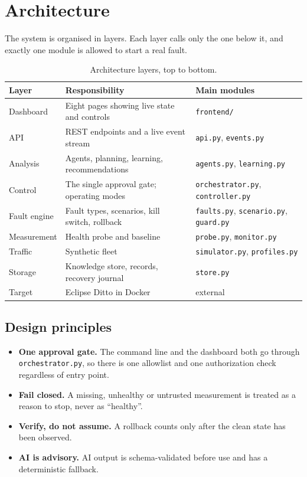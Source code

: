 \documentclass[11pt,a4paper]{article}
\begin{document}
\section{Architecture}

The system is organised in layers. Each layer calls only the one below it, and
exactly one module is allowed to start a real fault.

\begin{table}[h]
\centering
\begin{tabularx}{\textwidth}{@{}lLl@{}}
\toprule
\textbf{Layer} & \textbf{Responsibility} & \textbf{Main modules} \\
\midrule
Dashboard & Eight pages showing live state and controls & \texttt{frontend/} \\
API & REST endpoints and a live event stream & \texttt{api.py}, \texttt{events.py} \\
Analysis & Agents, planning, learning, recommendations & \texttt{agents.py}, \texttt{learning.py} \\
Control & The single approval gate; operating modes & \texttt{orchestrator.py}, \texttt{controller.py} \\
Fault engine & Fault types, scenarios, kill switch, rollback & \texttt{faults.py}, \texttt{scenario.py}, \texttt{guard.py} \\
Measurement & Health probe and baseline & \texttt{probe.py}, \texttt{monitor.py} \\
Traffic & Synthetic fleet & \texttt{simulator.py}, \texttt{profiles.py} \\
Storage & Knowledge store, records, recovery journal & \texttt{store.py} \\
Target & Eclipse Ditto in Docker & external \\
\bottomrule
\end{tabularx}
\caption{Architecture layers, top to bottom.}
\end{table}

\subsection{Design principles}

\begin{itemize}
  \item \textbf{One approval gate.} The command line and the dashboard both go
        through \texttt{orchestrator.py}, so there is one allowlist and one
        authorization check regardless of entry point.
  \item \textbf{Fail closed.} A missing, unhealthy or untrusted measurement is
        treated as a reason to stop, never as ``healthy''.
  \item \textbf{Verify, do not assume.} A rollback counts only after the clean
        state has been observed.
  \item \textbf{AI is advisory.} AI output is schema-validated before use and
        has a deterministic fallback.
\end{itemize}
\end{document}
